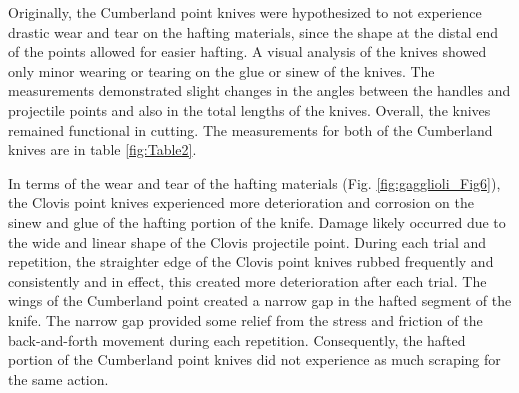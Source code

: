 


Originally, the Cumberland point knives were hypothesized to not experience drastic wear and tear on the hafting materials, since the shape at the distal end of the points allowed for easier hafting. A visual analysis of the knives showed only minor wearing or tearing on the glue or sinew of the knives. The measurements demonstrated slight changes in the angles between the handles and projectile points and also in the total lengths of the knives. Overall, the knives remained functional in cutting. The measurements for both of the Cumberland knives are in table \ref{fig:Table2}. 




In terms of the wear and tear of the hafting materials (Fig. \ref{fig:gagglioli_Fig6}), the Clovis point knives experienced more deterioration and corrosion on the sinew and glue of the hafting portion of the knife. Damage likely occurred due to the wide and linear shape of the Clovis projectile point. During each trial and repetition, the straighter edge of the Clovis point knives rubbed frequently and consistently and in 	
	effect, this created more deterioration after each trial. The wings of the Cumberland point created a narrow gap in the hafted segment of the knife. The narrow gap provided some relief from the stress and friction of the back-and-forth movement during each repetition. Consequently, the hafted portion of the Cumberland point knives did not experience as much scraping for the same action.
	
	
